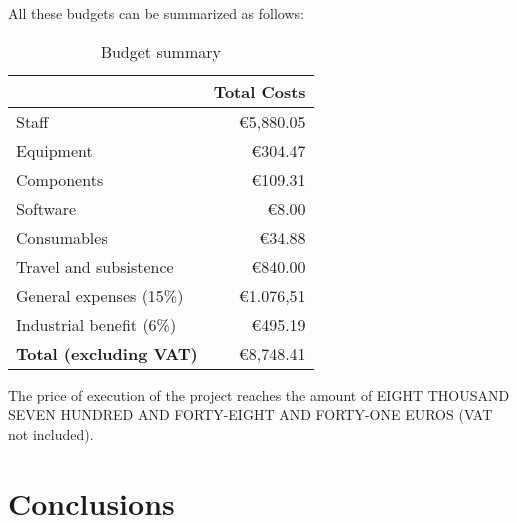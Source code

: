 All these budgets can be summarized as follows:
\begin{table}[H]
	\centering
	\caption{Budget summary}
	\label{tab:total_budget}
	\begin{tabular}{l|r|}
		\hline
		\rowcolor[HTML]{BFBFBF}
		\multicolumn{1}{|c|}{\cellcolor[HTML]{BFBFBF}\textbf{Budgets}} & \multicolumn{1}{c|}{\cellcolor[HTML]{BFBFBF}\textbf{Total Costs}} \\ \hline
		\multicolumn{1}{|l|}{Staff}                                    & €5,880.05                                                         \\ \hline
		\multicolumn{1}{|l|}{Equipment}                                & €304.47                                                           \\ \hline
		\multicolumn{1}{|l|}{Components}                               & €109.31                                                           \\ \hline
		\multicolumn{1}{|l|}{Software}                                 & €8.00                                                             \\ \hline
		\multicolumn{1}{|l|}{Consumables}                              & €34.88                                                            \\ \hline
		\multicolumn{1}{|l|}{Travel and subsistence}                   & €840.00                                                           \\ \hline
		\multicolumn{1}{|l|}{General expenses (15\%)}                  & €1.076,51                                                         \\ \hline
		\multicolumn{1}{|l|}{Industrial benefit (6\%)}                 & €495.19                                                           \\ \hline
		\multicolumn{1}{r|}{\textbf{Total (excluding VAT)}}            & €8,748.41                                                         \\ \cline{2-2}
	\end{tabular}
\end{table}

\noindent
The price of execution of the project reaches the amount of \MakeUppercase{eight thousand seven hundred and forty-eight and forty-one euros} (VAT not included).

\section{Conclusions}\label{sec:conclusions}
